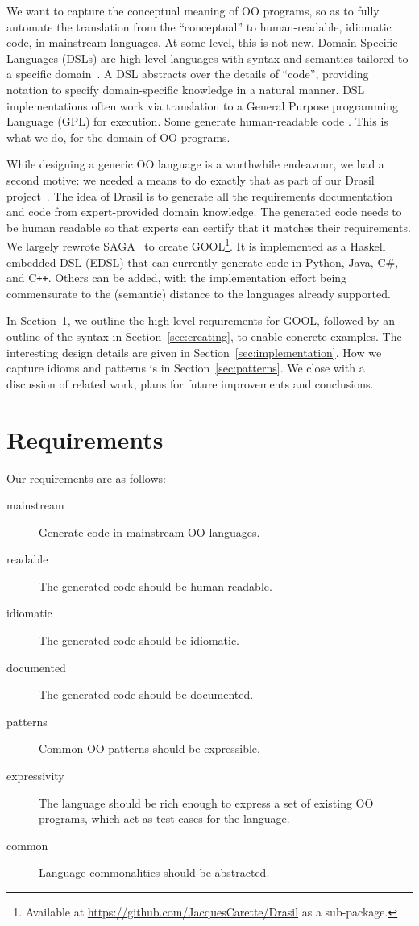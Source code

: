 \documentclass[sigplan,screen,10pt]{acmart}
\newcommand{\Csharp}{C\#}
\newcommand{\Cplusplus}{C\texttt{++}}
\begin{document}
We want to capture the conceptual meaning of
OO programs, so as to fully automate the translation from
the ``conceptual'' to human-readable, idiomatic code, in mainstream
languages.
At some level, this is not new.  Domain-Specific Languages (DSLs)
are high-level languages with syntax and semantics tailored to a specific
domain~\cite{mernik2005and}.  A DSL
abstracts over the details of ``code'', providing notation to
specify domain-specific knowledge in a natural manner. DSL implementations
often work via translation to a General Purpose programming Language (GPL) for 
execution.  Some generate
human-readable code \cite{wang1997zephyr, mooij2013gaining, hong2012green, 
beyak2011saga}.  This is what we do, for the domain of OO programs.

While designing a generic OO language is a worthwhile endeavour, we had
a second motive: we needed a means to do exactly that as part of
our Drasil project~\cite{Drasil2019, SzymczakEtAl2016}.  The idea of Drasil is
to generate all the requirements documentation and code from expert-provided
domain knowledge.  The generated code needs to be human readable so that
experts can certify that it matches their requirements.
We largely rewrote SAGA~\cite{beyak2011saga} to create
GOOL\footnote{Available at \url{https://github.com/JacquesCarette/Drasil}
as a sub-package.}.
It is implemented as a Haskell embedded DSL (EDSL) that
can currently generate code in Python, Java, \Csharp, and \Cplusplus.
Others can be added, with the implementation effort being commensurate to the
(semantic) distance to the languages already supported.

In Section~\ref{sec:req}, we outline the high-level requirements for GOOL,
followed by an outline of the syntax in Section~\ref{sec:creating}, to
enable concrete examples. The interesting design details are given in
Section~\ref{sec:implementation}. How we capture idioms and patterns is
in Section~\ref{sec:patterns}. We
close with a discussion of related work, plans for future improvements
and conclusions.

\section{Requirements} \label{sec:req}

Our requirements are as follows:

\begin{description}
\item[mainstream] Generate code in mainstream OO languages.
\item[readable] The generated code should be human-readable.
\item[idiomatic] The generated code should be idiomatic.
\item[documented] The generated code should be documented.
\item[patterns] Common OO patterns should be expressible.
\item[expressivity] The language should be rich enough to express a
set of existing OO programs, which act as test cases for the language.
\item[common] Language commonalities should be abstracted.
\end{description}
\end{document}
